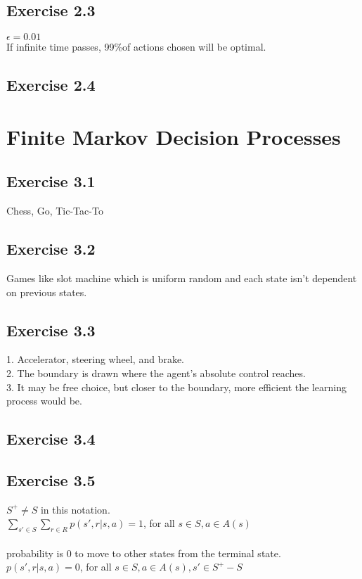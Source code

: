 \documentclass{report}
\begin{document}
\section*{Exercise 2.3}
$\epsilon=0.01$\\
If infinite time passes, 99\%of actions chosen will be optimal.

\section*{Exercise 2.4}

\chapter{Finite Markov Decision Processes}
\section*{Exercise 3.1}
Chess, Go, Tic-Tac-To

\section*{Exercise 3.2}
Games like slot machine which is  uniform random and each state isn't dependent on previous states.

\section*{Exercise 3.3}
1. Accelerator, steering wheel, and brake.\\
2. The boundary is drawn where the agent's absolute control reaches.\\
3. It may be free choice, but closer to the boundary, more efficient the learning process would be.

\section*{Exercise 3.4}

\section*{Exercise 3.5}
$S^+ \neq S$ in this notation.\\
$\sum_{s'\in S}\sum_{r \in R}p(s',r|s,a)=1$, for all $s\in S,a\in A(s)$\\\\
probability is 0 to move to other states from the terminal state.\\
$p(s',r|s,a)=0$, for all $s\in S,a\in A(s), s' \in S^+ - S$
\end{document}
